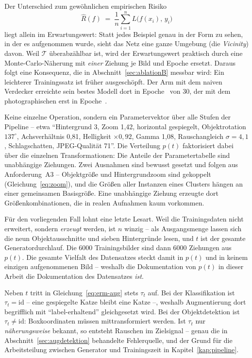 Der Unterschied zum gewöhnlichen empirischen Risiko
\[
\hat{R}(f) \;=\; \frac{1}{n}\sum_{i=1}^{n} L\big(f(x_i),\, y_i\big)
\]
liegt allein im Erwartungswert: Statt jedes Beispiel genau in der Form zu sehen,
in der es aufgenommen wurde, sieht das Netz eine ganze Umgebung (die \emph{Vicinity}) davon. Weil
$\mathcal{T}$ überabzählbar ist, wird der Erwartungswert praktisch durch eine
Monte-Carlo-Näherung mit \emph{einer} Ziehung je Bild und Epoche ersetzt. Daraus
folgt eine Konsequenz, die in Abschnitt~\ref{sec:ablationB} messbar wird: Ein
leichterer Trainingssatz ist früher ausgeschöpft. Der Arm mit dem naiven
Verdecker erreichte sein bestes Modell dort in Epoche~\zBTwoEpoche{} von 30, der
mit dem photographischen erst in Epoche~\zBZeroEpoche.

 Keine einzelne Operation,
sondern ein Parametervektor über alle Stufen der Pipeline -- etwa
\enquote{Hintergrund 3, Zoom 1,42, horizontal gespiegelt, Objektrotation
$137^\circ$, Achsverhältnis 0,81, Helligkeit $\times 0{,}92$, Gamma 1,08,
Rauschangleich $\sigma = 4{,}1$, Schlagschatten, JPEG-Qualität 71}. Die
Verteilung $p(t)$ faktorisiert dabei über die einzelnen Transformationen: Die
Anteile der Parametertabelle sind unabhängige Ziehungen. Zwei Ausnahmen sind
bewusst gesetzt und folgen aus Anforderung~A3 -- Objektgröße und
Hintergrundzoom sind gekoppelt (Gleichung~\eqref{eq:zoom}), und die Größen aller
Instanzen eines Clusters hängen an einer gemeinsamen Basisgröße. Eine
unabhängige Ziehung erzeugte dort Größenkombinationen, die in realen
Aufnahmen kaum vorkommen.


Für den vorliegenden Fall lohnt eine letzte Lesart. Weil die Trainingsdaten
nicht erweitert, sondern \emph{erzeugt} werden, ist $n$ winzig -- als
Ausgangsmenge lassen sich die neun Objektausschnitte und sieben Hintergründe
lesen, und $t$ ist der gesamte Generatordurchlauf. Die 6000 Trainingsbilder sind
dann 6000 Ziehungen aus $p(t)$. Die gesamte Vielfalt des Datensatzes steckt
damit in $p(t)$ und in keinem einzigen aufgenommenen Bild -- weshalb die
Dokumentation von $p(t)$ in dieser Arbeit die Dokumentation des Datensatzes
\emph{ist}.

 Neben $t$ tritt in
Gleichung~\eqref{eq:erm-aug} stets $\tau_t$ auf. Bei der Klassifikation ist
$\tau_t = \mathrm{id}$ -- eine gespiegelte Katze bleibt eine Katze --, weshalb
Augmentierung dort begrifflich mit \enquote{label-erhaltend} gleichgesetzt wird.
Bei der Objektdetektion ist $\tau_t \neq \mathrm{id}$: Boxkoordinaten müssen
mittransformiert werden. Ist $\tau_t$ nur \emph{näherungsweise} bekannt, so
entsteht Rauschen im Zielsignal -- genau die in
Abschnitt~\ref{sec:augdetektion} behandelte Fehlerquelle, und der Grund für die
Arbeitsteilung zwischen Generator und Trainingszeit in
Kapitel~\ref{kap:pipeline}.

